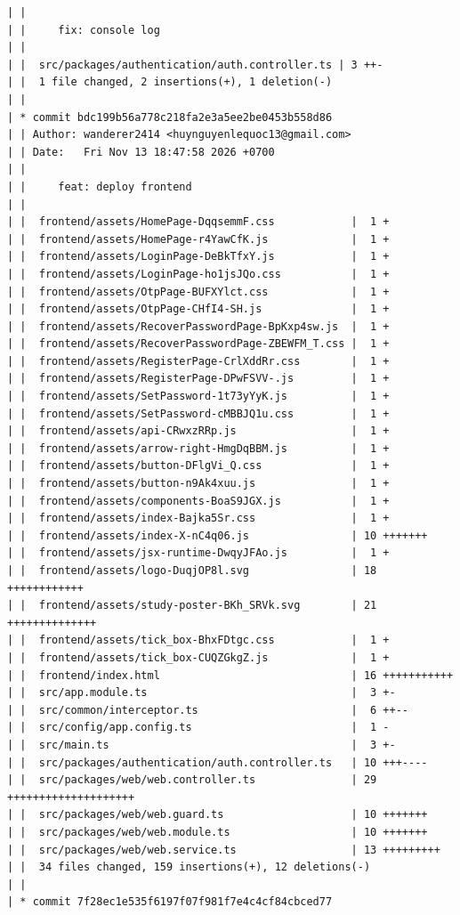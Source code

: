 \documentclass[12pt]{article}
\begin{document}
\begin{lstlisting}[numbers=none,breaklines=true]
| |
| |     fix: console log
| |
| |  src/packages/authentication/auth.controller.ts | 3 ++-
| |  1 file changed, 2 insertions(+), 1 deletion(-)
| |
| * commit bdc199b56a778c218fa2e3a5ee2be0453b558d86
| | Author: wanderer2414 <huynguyenlequoc13@gmail.com>
| | Date:   Fri Nov 13 18:47:58 2026 +0700
| |
| |     feat: deploy frontend
| |
| |  frontend/assets/HomePage-DqqsemmF.css            |  1 +
| |  frontend/assets/HomePage-r4YawCfK.js             |  1 +
| |  frontend/assets/LoginPage-DeBkTfxY.js            |  1 +
| |  frontend/assets/LoginPage-ho1jsJQo.css           |  1 +
| |  frontend/assets/OtpPage-BUFXYlct.css             |  1 +
| |  frontend/assets/OtpPage-CHfI4-SH.js              |  1 +
| |  frontend/assets/RecoverPasswordPage-BpKxp4sw.js  |  1 +
| |  frontend/assets/RecoverPasswordPage-ZBEWFM_T.css |  1 +
| |  frontend/assets/RegisterPage-CrlXddRr.css        |  1 +
| |  frontend/assets/RegisterPage-DPwFSVV-.js         |  1 +
| |  frontend/assets/SetPassword-1t73yYyK.js          |  1 +
| |  frontend/assets/SetPassword-cMBBJQ1u.css         |  1 +
| |  frontend/assets/api-CRwxzRRp.js                  |  1 +
| |  frontend/assets/arrow-right-HmgDqBBM.js          |  1 +
| |  frontend/assets/button-DFlgVi_Q.css              |  1 +
| |  frontend/assets/button-n9Ak4xuu.js               |  1 +
| |  frontend/assets/components-BoaS9JGX.js           |  1 +
| |  frontend/assets/index-Bajka5Sr.css               |  1 +
| |  frontend/assets/index-X-nC4q06.js                | 10 +++++++
| |  frontend/assets/jsx-runtime-DwqyJFAo.js          |  1 +
| |  frontend/assets/logo-DuqjOP8l.svg                | 18 ++++++++++++
| |  frontend/assets/study-poster-BKh_SRVk.svg        | 21 ++++++++++++++
| |  frontend/assets/tick_box-BhxFDtgc.css            |  1 +
| |  frontend/assets/tick_box-CUQZGkgZ.js             |  1 +
| |  frontend/index.html                              | 16 +++++++++++
| |  src/app.module.ts                                |  3 +-
| |  src/common/interceptor.ts                        |  6 ++--
| |  src/config/app.config.ts                         |  1 -
| |  src/main.ts                                      |  3 +-
| |  src/packages/authentication/auth.controller.ts   | 10 +++----
| |  src/packages/web/web.controller.ts               | 29 ++++++++++++++++++++
| |  src/packages/web/web.guard.ts                    | 10 +++++++
| |  src/packages/web/web.module.ts                   | 10 +++++++
| |  src/packages/web/web.service.ts                  | 13 +++++++++
| |  34 files changed, 159 insertions(+), 12 deletions(-)
| |
| * commit 7f28ec1e535f6197f07f981f7e4c4cf84cbced77

\end{lstlisting}
\end{document}

